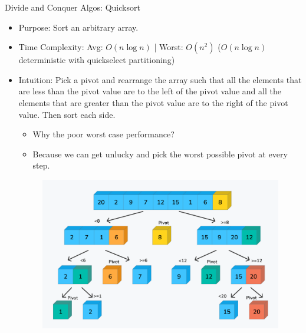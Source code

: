 \documentclass{beamer}
\begin{document}
\begin{frame}[t]{Divide and Conquer Algos: Quicksort}
    \begin{itemize}
        \item \alert{Purpose:} Sort an arbitrary array.
        \item \alert{Time Complexity}: Avg: $O(n \log n)$ | Worst: $O(n^2)$ ($O(n \log n)$ deterministic with quickselect partitioning)
        \item \alert{Intuition}: Pick a pivot and rearrange the array such that all the elements that are less than the pivot value are to the left of the pivot value and all the elements that are greater than the pivot value are to the right of the pivot value. Then sort each side.   
        \begin{itemize}
            \item \alert{Why the poor worst case performance?}
            \item Because we can get unlucky and pick the worst possible pivot at every step.
        \end{itemize}
        \begin{figure}
            \centering
            \includegraphics[width=0.5\linewidth]{quicksort.png}
        \end{figure}
    \end{itemize}
    \end{frame}
\end{document}
